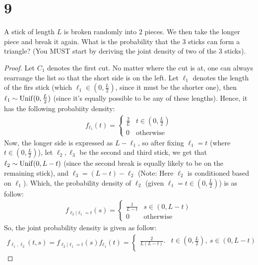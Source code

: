 \documentclass{article}
\begin{document}
\newpage

\section*{9}
\begin{ques}\label{q8}
    A stick of length $L$ is broken randomly into $2$ pieces. We then take the longer piece and break it again. What is the probability that the $3$ sticks can form a triangle? (You MUST start by deriving the joint density of two of the $3$ sticks). 
\end{ques}

\begin{proof}
    Let $C_1$ denotes the first cut. No matter where the cut is at, one can always rearrange the list so that the short side is on the left. Let $\ell_1$ denotes the length of the firs stick (which $\ell_1\in (0,\frac{L}{2})$, since it must be the shorter one), then $\ell_1\sim \mathrm{Unif}(0,\frac{L}{2})$ (since it's equally possible to be any of these lengths). Hence, it has the following probabiity density:
    \begin{align}
        f_{\ell_1}(t)=\begin{cases}
            \frac{2}{L} & t\in(0,\frac{L}{2})\\
            0 & \text{otherwise}
        \end{cases}
    \end{align}
    Now, the longer side is expressed as $L-\ell_1$, so after fixing $\ell_1=t$ (where $t\in(0,\frac{L}{2})$), let $\ell_2,\ell_3$ be the second and third stick, we get that $\ell_2\sim \mathrm{Unif}(0,L-t)$ (since the second break is equally likely to be on the remaining stick), and $\ell_3=(L-t)-\ell_2$ (Note: Here $\ell_2$ is conditioned based on $\ell_1$). Which, the probability density of $\ell_2$ (given $\ell_1=t\in(0,\frac{L}{2})$) is as follow:
    \begin{align}
        f_{\ell_2|\ell_1=t}(s) = \begin{cases}
            \frac{1}{L-t} & s\in (0,L-t)\\
            0 & \text{otherwise}
        \end{cases}
    \end{align}
    So, the joint probability density is given as follow:
    \begin{align}
        f_{\ell_1,\ell_2}(t,s) = f_{\ell_2|\ell_1=t}(s)f_{\ell_1}(t) = \begin{cases}
            \frac{2}{L(L-t)}.& t\in(0,\frac{L}{2}),\ s\in(0,L-t)\\

\end{cases}
\end{align}
\end{proof}
\end{document}
